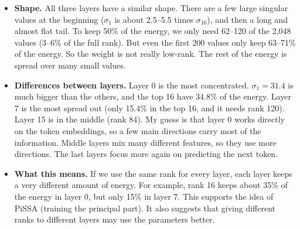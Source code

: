 \documentclass[10pt,a4paper]{article}
\begin{document}
\begin{itemize}
  \item \textbf{Shape.} All three layers have a similar shape. There are a few large singular values at the
  beginning ($\sigma_1$ is about 2.5--5.5 times $\sigma_{16}$), and then a long and almost flat tail. To keep 50\% of the
  energy, we only need 62--120 of the 2,048 values (3--6\% of the full rank). But even the first 200 values only
  keep 63--71\% of the energy. So the weight is not really low-rank. The rest of the energy is spread over many
  small values.
  \item \textbf{Differences between layers.} Layer 0 is the most concentrated. $\sigma_1 = 31.4$ is much bigger
  than the others, and the top 16 have 34.8\% of the energy. Layer 7 is the most spread out (only 15.4\% in the
  top 16, and it needs rank 120). Layer 15 is in the middle (rank 84). My guess is that layer 0 works directly on
  the token embeddings, so a few main directions carry most of the information. Middle layers mix many different
  features, so they use more directions. The last layers focus more again on predicting the next token.
  \item \textbf{What this means.} If we use the same rank for every layer, each layer keeps a very different amount
  of energy. For example, rank 16 keeps about 35\% of the energy in layer 0, but only 15\% in layer 7. This
  supports the idea of PiSSA (training the principal part). It also suggests that giving different ranks to
  different layers may use the parameters better.
\end{itemize}
\end{document}

